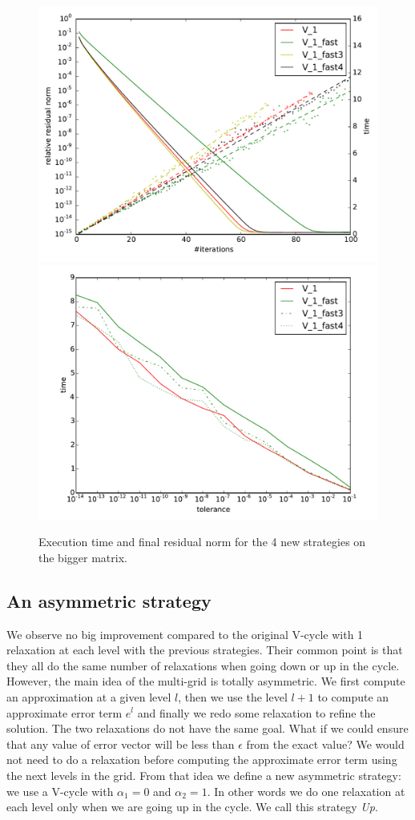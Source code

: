 \documentclass[a4paper,10pt]{article}
\begin{document}
  \begin{figure}
  \includegraphics[width=0.49\linewidth]{figs/convergence_fast.pdf}
   \includegraphics[width=0.49\linewidth]{figs/time_convergence_fast.pdf}
   \caption{Execution time and final residual norm for the 4 new strategies on the bigger matrix.}
   \label{fig.newstrat}
  \end{figure}
  
\subsection{An asymmetric strategy}
  We observe no big improvement compared to the original V-cycle with 1 relaxation at each level with the previous strategies.
  Their common point is that they all do the same number of relaxations when going down or up in the cycle. However, the main idea of the multi-grid is totally asymmetric.
  We first compute an approximation at a given level $l$, then we use the level $l+1$ to compute an approximate error term $e^l$ and finally we redo some relaxation to refine the solution. The two relaxations do not have the same goal.
  What if we could ensure that any value of error vector will be less than $\epsilon$ from the exact value? We would not need to do a relaxation
  before computing the approximate error term using the next levels in the grid. From that idea we define a new asymmetric strategy: we use a V-cycle with $\alpha_1 = 0$ and $\alpha_2 = 1$. In other words
  we do one relaxation at each level only when we are going up in the cycle. We call this strategy \emph{Up}.
  
\end{document}
